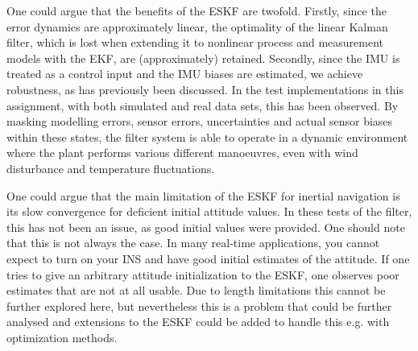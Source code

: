 
One could argue that the benefits of the ESKF are twofold. Firstly, since the error dynamics are approximately linear, the optimality of the linear Kalman filter, which is lost when extending it to nonlinear process and measurement models with the EKF, are (approximately) retained. Secondly, since the IMU is treated as a control input and the IMU biases are estimated, we achieve robustness, as has previously been discussed. In the test implementations in this assignment, with both simulated and real data sets, this has been observed. By masking modelling errors, sensor errors, uncertainties and actual sensor biases within these states, the filter system is able to operate in a dynamic environment where the plant performs various different manoeuvres, even with wind disturbance and temperature fluctuations.

One could argue that the main limitation of the ESKF for inertial navigation is its slow convergence for deficient initial attitude values. In these tests of the filter, this has not been an issue, as good initial values were provided. One should note that this is not always the case. In many real-time applications, you cannot expect to turn on your INS and have good initial estimates of the attitude. If one tries to give an arbitrary attitude initialization to the ESKF, one observes poor estimates that are not at all usable. Due to length limitations this cannot be further explored here, but nevertheless this is a problem that could be further analysed and extensions to the ESKF could be added to handle this e.g. with optimization methods.